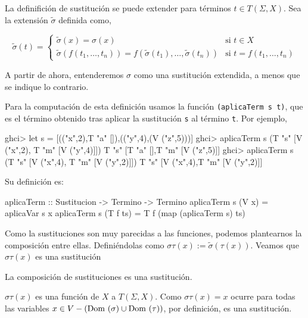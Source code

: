 La definifición de sustitución se puede extender para términos
$t \in T(\Sigma, X)$. Sea la extensión $\tilde{\sigma}$ definida como,

\begin{equation*}
  \tilde{\sigma}(t)=
  \left\lbrace
    \begin{array}{ll}
      \tilde{\sigma}(x) = \sigma(x) 
        & \text{si } t \in X \\
      \tilde{\sigma}(f(t_1, \dots, t_n)) = f(\tilde{\sigma}(t_1), \dots, \tilde{\sigma}(t_n)) 
        & \text{si } t = f(t_1, \dots, t_n)
    \end{array}
  \right.
\end{equation*}

A partir de ahora, entenderemos $\sigma$ como una sustitución
extendida, a menos que se indique lo contrario.

Para la computación de esta definición usamos la función
\texttt{(aplicaTerm s t)}, que es el término obtenido tras aplicar la
sustitución \texttt{s} al término \texttt{t}. Por ejemplo,

\begin{sesion}
ghci> let s = [(("x",2),T "a" []),(("y",4),(V ("z",5)))]
ghci> aplicaTerm s (T "s" [V ("x",2), T "m" [V ("y",4)]])
T "s" [T "a" [],T "m" [V ("z",5)]]
ghci> aplicaTerm s (T "s" [V ("x",4), T "m" [V ("y",2)]])
T "s" [V ("x",4),T "m" [V ("y",2)]]
\end{sesion}

Su definición es:

\begin{codigo}
aplicaTerm :: Sustitucion -> Termino -> Termino
aplicaTerm s (V x)    = aplicaVar s x
aplicaTerm s (T f ts) = T f (map (aplicaTerm s) ts)
\end{codigo}

Como la sustituciones son muy parecidas a las funciones, podemos
plantearnos la composición entre ellas. Definiéndolas como $\sigma\tau(x) :=
\tilde{\sigma}(\tau(x))$. Veamos que $\sigma\tau(x)$ es una sustitución

\begin{lema}
  La composición de sustituciones es una sustitución.
\end{lema}

\begin{demo}
  $\sigma\tau(x)$ es una función de $X$ a $T(\Sigma, X)$. Como
  $\sigma\tau(x) = x$ ocurre para todas las variables
  $x\in V - (\mbox{Dom }(\sigma)\cup \mbox{Dom }(\tau))$, por definición, es una
  sustitución.
\end{demo}

